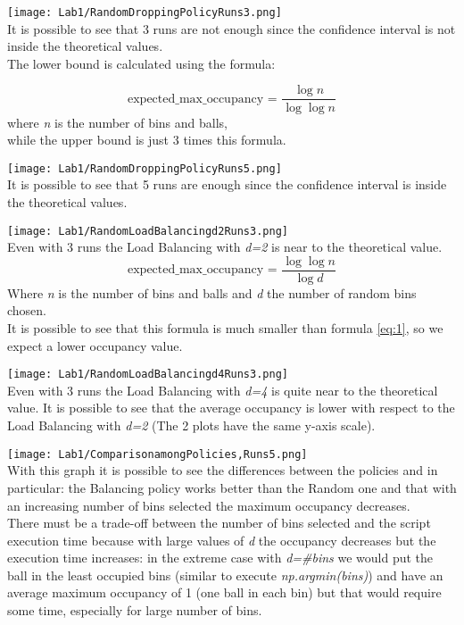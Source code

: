 \documentclass[twocolumn,letterpaper]{report}
\begin{document}
{			\noindent
			
			\texttt{[image: Lab1/RandomDroppingPolicyRuns3.png]} \\
			It is possible to see that 3 runs are not enough since the confidence interval is not inside the theoretical values. \\
			The lower bound is calculated using the formula:
			
			\begin{equation} \label{eq:1}
				 \text{expected\_max\_occupancy = }\frac{\log n}{\log \log n} 
			\end{equation}
			where \emph{n} is the number of bins and balls,\\
			while the upper bound is just 3 times this formula.
						
			\texttt{[image: Lab1/RandomDroppingPolicyRuns5.png]} \\
			It is possible to see that 5 runs are enough since the confidence interval is inside the theoretical values.
						
			\texttt{[image: Lab1/RandomLoadBalancingd2Runs3.png]} \\
			Even with 3 runs the Load Balancing with \emph{d=2} is near to the theoretical value.
			\begin{equation} \label{eq:2}
				 \text{expected\_max\_occupancy = }\frac{\log \log n}{\log d}
			\end{equation}
			Where \emph{n} is the number of bins and balls and \emph{d} the number of random bins chosen. \\
			It is possible to see that this formula is much smaller than formula \ref{eq:1}, so we expect a lower occupancy value.
			
			\texttt{[image: Lab1/RandomLoadBalancingd4Runs3.png]} \\
			Even with 3 runs the Load Balancing with \emph{d=4} is quite near to the theoretical value. 
			It is possible to see that the average occupancy is lower with respect to the Load Balancing with \emph{d=2} (The 2 plots have the same y-axis scale).
			
			\texttt{[image: Lab1/ComparisonamongPolicies,Runs5.png]} \\
			With this graph it is possible to see the differences between the policies and in particular: the Balancing policy works better than the Random one and that with an increasing number of bins selected the maximum occupancy decreases. \\ There must be a trade-off between the number of bins selected and the script execution time because with large values of \emph{d} the occupancy decreases but the execution time increases: in the extreme case with \emph{d=\#bins} we would put the ball in the least occupied bins (similar to execute \emph{np.argmin(bins)}) and have an average maximum occupancy of 1 (one ball in each bin)  but that would require some time, especially for large number of bins.
			
}
\end{document}
